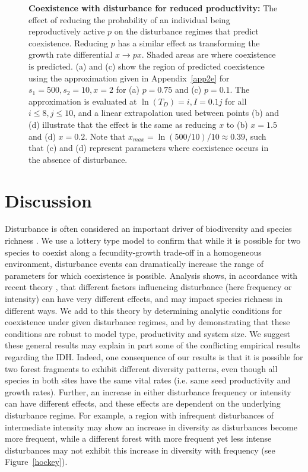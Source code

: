 \begin{figure}[htbp]
\begin{center}
\caption[Coexistence with disturbance for reduced productivity]{\textbf{Coexistence with disturbance for reduced productivity:} The effect of reducing the probability of an individual being reproductively active $p$ on the disturbance regimes that predict coexistence. Reducing $p$ has a similar effect as transforming the growth rate differential $x \to px$. Shaded areas are where coexistence is predicted. (a) and (c) show the region of predicted coexistence using the approximation given in Appendix~\ref{app2e} for $s_1=500,s_2=10,x=2$ for (a) $p=0.75$ and (c) $p=0.1$. The approximation is evaluated at $\ln(T_D)=i, I=0.1j$ for all $i\leq8, j\leq 10$, and a linear extrapolation used between points (b) and (d) illustrate that the effect is the same as reducing $x$ to (b) $x=1.5$ and (d) $x=0.2$. Note that $x_{max}=\ln(500/10)/10\approx 0.39$, such that (c) and (d) represent parameters where coexistence occurs in the absence of disturbance.}
\label{pfigure}
\end{center}
\end{figure}


\section{Discussion} \label{discuss}
Disturbance is often considered an important driver of biodiversity and species richness \citep[e.g.][]{denslow1987tropical,lawton1988natural,sousa1984role}. We use a lottery type model to confirm that while it is possible for two species to coexist along a fecundity-growth trade-off in a homogeneous environment, disturbance events can dramatically increase the range of parameters for which coexistence is possible. Analysis shows, in accordance with recent theory \citep{miller2011frequency}, that different factors influencing disturbance (here frequency or intensity) can have very different effects, and may impact species richness in different ways. We add to this theory by determining analytic conditions for coexistence under given disturbance regimes, and by demonstrating that these conditions are robust to model type, productivity and system size. We suggest these general results may explain in part some of the conflicting empirical results regarding the IDH. Indeed, one consequence of our results is that it is possible for two forest fragments to exhibit different diversity patterns, even though all species in both sites have the same vital rates (i.e. same seed productivity and growth rates). Further, an increase in either disturbance frequency or intensity can have different effects, and these effects are dependent on the underlying disturbance regime. For example, a region with infrequent disturbances of intermediate intensity may show an increase in diversity as disturbances become more frequent, while a different forest with more frequent yet less intense disturbances may not exhibit this increase in diversity with frequency (see Figure~\ref{hockey}).

